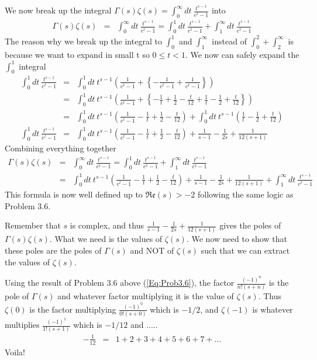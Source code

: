 \documentclass[aps,preprint,preprintnumbers,nofootinbib,showpacs,prd]{revtex4-1}
\newcommand{\nbea}{\begin{eqnarray*}}
\newcommand{\neea}{\end{eqnarray*}}
\begin{document}
We now break up the integral $\Gamma(s)\zeta(s) = \int_0^\infty dt~ \frac{t^{s-1}}{e^t - 1}$ into
%
\nbea
\Gamma(s)\zeta(s) & = & \int_0^\infty dt~ \frac{t^{s-1}}{e^t - 1} = \int_0^1 dt~ \frac{t^{s-1}}{e^t - 1} + \int_1^\infty dt~ \frac{t^{s-1}}{e^t - 1}
\neea
%
The reason why we break up the integral to $\int_0^1$ and $\int_1^\infty $ instead of $\int_0^2 + \int_2^\infty $ is because we want to expand in small t so $0 \leq t < 1$. We now can safely expand the $\int_0^1$ integral
%
\nbea
\int_0^1 dt~ \frac{t^{s-1}}{e^t - 1} & = & \int_0^1 dt~ t^{s-1} \left ( \frac{1}{e^t - 1} + \left\{ -\frac{1}{e^t - 1} + \frac{1}{e^t - 1}\right \}  \right ) \\
& = & \int_0^1 dt~ t^{s-1} \left ( \frac{1}{e^t - 1} + \left\{ -\frac{1}{t} + \frac{1}{2} - \frac{t}{12} +\frac{1}{t} - \frac{1}{2} + \frac{t}{12} \right \}  \right ) \\
& = & \int_0^1 dt~ t^{s-1} \left ( \frac{1}{e^t - 1}  -\frac{1}{t} + \frac{1}{2} - \frac{t}{12} \right ) + \int_0^1 dt~ t^{s-1} \left ( \frac{1}{t} - \frac{1}{2} + \frac{t}{12}  \right ) \\
\int_0^1 dt~ \frac{t^{s-1}}{e^t - 1} & = &  \int_0^1 dt~ t^{s-1} \left ( \frac{1}{e^t - 1}  -\frac{1}{t} + \frac{1}{2} - \frac{t}{12} \right ) + \frac{1}{s-1} - \frac{1}{2s} + \frac{1}{12(s+1)}
\neea
%
Combining everything together 
%
\nbea
\Gamma(s)\zeta(s) & = & \int_0^\infty dt~ \frac{t^{s-1}}{e^t - 1} = \int_0^1 dt~ \frac{t^{s-1}}{e^t - 1} + \int_1^\infty dt~ \frac{t^{s-1}}{e^t - 1} \\
& = & \int_0^1 dt~ t^{s-1} \left ( \frac{1}{e^t - 1}  -\frac{1}{t} + \frac{1}{2} - \frac{t}{12} \right ) + \frac{1}{s-1} - \frac{1}{2s} + \frac{1}{12(s+1)} + \int_1^\infty dt~ \frac{t^{s-1}}{e^t - 1}
\neea
%
This formula is now well defined up to $\mathfrak{Re}(s) > -2$ following the same logic as Problem 3.6.

Remember that $s$ is complex, and thus $ \frac{1}{s-1} - \frac{1}{2s} + \frac{1}{12(s+1)}$ gives the poles of $\Gamma(s)\zeta(s)$. What we need is the values of $\zeta(s)$. We now need to show that these poles are the poles of $\Gamma(s)$ and NOT of $\zeta(s)$ such that we can extract the values of $\zeta(s)$.

Using the result of Problem 3.6 above (\ref{Eq:Prob3.6}), the factor $\frac{(-1)^n}{n!(s+n)}$ is the pole of $\Gamma(s)$ and whatever factor multiplying it is the value of $\zeta(s)$. Thus $\zeta(0)$ is the factor multiplying $\frac{(-1)^0}{0!(s+0)}$ which is $-1/2$, and $\zeta(-1)$ is whatever multiplies $\frac{(-1)^1}{1!(s+1)}$ which is $-1/12$ and .....
%
\nbea
-\frac{1}{12} & = & 1 + 2 + 3 + 4 + 5 + 6 + 7 + ...
\neea
%
Voila!
\end{document}

